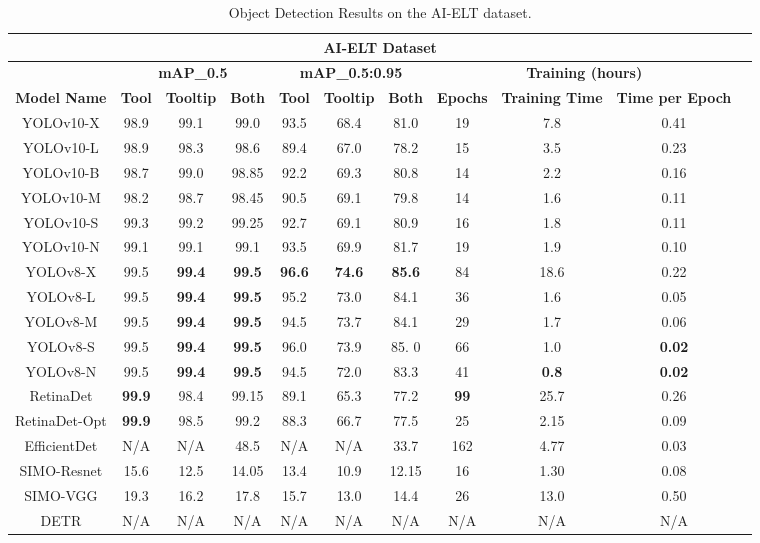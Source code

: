 \begin{longtable}{|c|c|c|c|c|c|c|c|c|c|c|}
\caption{Object Detection Results on the AI-ELT dataset.}
\label{fig:modelresults}
\hline
\multicolumn{11}{|c|}{\textbf{AI-ELT Dataset}} \\
\hline
\multicolumn{1}{|c|}{} & \multicolumn{3}{c|}{\textbf{mAP_{0.5}}} & \multicolumn{3}{c|}{\textbf{mAP_{0.5:0.95}}} & \multicolumn{3}{c|}{\textbf{Training (hours)}} \\
\hline
\textbf{Model Name} & \textbf{Tool} & \textbf{Tooltip} & \textbf{Both} & \textbf{Tool} & \textbf{Tooltip} & \textbf{Both} & \textbf{Epochs} & \textbf{Training Time} & \textbf{Time per Epoch} \\ 
\hline
YOLOv10-X & 98.9 & 99.1 & 99.0 & 93.5 & 68.4 & 81.0 & 19 & 7.8 & 0.41 \\ 
YOLOv10-L & 98.9 & 98.3 & 98.6 & 89.4 & 67.0 & 78.2 & 15 & 3.5 & 0.23 \\ 
YOLOv10-B & 98.7 & 99.0 & 98.85 & 92.2 & 69.3 & 80.8 & 14 & 2.2 & 0.16 \\ 
YOLOv10-M & 98.2 & 98.7 & 98.45 & 90.5 & 69.1 & 79.8 & 14 & 1.6 & 0.11 \\ 
YOLOv10-S & 99.3 & 99.2 & 99.25 & 92.7 & 69.1 & 80.9 & 16 & 1.8 & 0.11 \\ 
YOLOv10-N & 99.1 & 99.1 & 99.1 & 93.5 & 69.9 & 81.7 & 19 & 1.9 & 0.10 \\ 
YOLOv8-X & 99.5 & \textbf{99.4} & \textbf{99.5} & \textbf{96.6} & \textbf{74.6} & \textbf{85.6} & 84 & 18.6 & 0.22 \\ 
YOLOv8-L & 99.5 & \textbf{99.4} & \textbf{99.5} & 95.2 & 73.0 & 84.1 & 36 & 1.6 & 0.05 \\ 
YOLOv8-M & 99.5 & \textbf{99.4} & \textbf{99.5} & 94.5 & 73.7 & 84.1 & 29 & 1.7 & 0.06 \\ 
YOLOv8-S & 99.5 & \textbf{99.4} & \textbf{99.5} & 96.0 & 73.9 & 85. 0& 66 & 1.0 & \textbf{0.02} \\ 
YOLOv8-N & 99.5 & \textbf{99.4} & \textbf{99.5} & 94.5 & 72.0 & 83.3 & 41 & \textbf{0.8} & \textbf{0.02} \\ 
RetinaDet & \textbf{99.9} & 98.4 & 99.15 & 89.1 & 65.3 & 77.2 & \textbf{99} & 25.7 & 0.26 \\ 
RetinaDet-Opt & \textbf{99.9} & 98.5 & 99.2 & 88.3 & 66.7 & 77.5 & 25 & 2.15 & 0.09 \\ 
EfficientDet & N/A & N/A & 48.5 & N/A & N/A & 33.7 & 162 & 4.77 & 0.03 \\ 
SIMO-Resnet & 15.6 & 12.5 & 14.05 & 13.4 & 10.9 & 12.15 & 16 & 1.30 & 0.08 \\ 
SIMO-VGG & 19.3 & 16.2 & 17.8 & 15.7 & 13.0 & 14.4 & 26 & 13.0 & 0.50 \\ 
DETR & N/A & N/A & N/A & N/A & N/A & N/A & N/A & N/A & N/A \\
\hline
\end{longtable}

